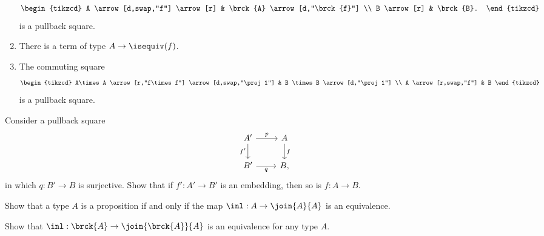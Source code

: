 \begin{exercises}
\begin{enumerate}
\begin{equation*}
\begin{tikzcd}
A \arrow[d,swap,"f"] \arrow[r] & \brck{A} \arrow[d,"\brck{f}"] \\
B \arrow[r] & \brck{B}.
\end{tikzcd}
\end{equation*}
is a pullback square.
\item There is a term of type $A\to\isequiv(f)$.
\item The commuting square
\begin{equation*}
\begin{tikzcd}
A\times A \arrow[r,"f\times f"] \arrow[d,swap,"\proj 1"] & B \times B \arrow[d,"\proj 1"] \\
A \arrow[r,swap,"f"] & B
\end{tikzcd}
\end{equation*}
is a pullback square. 
\end{enumerate}
\item Consider a pullback square
\begin{equation*}
\begin{tikzcd}
A' \arrow[d,swap,"{f'}"] \arrow[r,"p"] & A \arrow[d,"f"] \\
B' \arrow[r,swap,"q"] & B,
\end{tikzcd}
\end{equation*}
in which $q:B'\to B$ is surjective. Show that if $f':A'\to B'$ is an embedding, then so is $f:A\to B$.
\item Show that a type $A$ is a proposition if and only if the map $\inl:A\to \join{A}{A}$ is an equivalence.
\item Show that $\inl:\brck{A}\to \join{\brck{A}}{A}$ is an equivalence for any type $A$.
\end{exercises}

